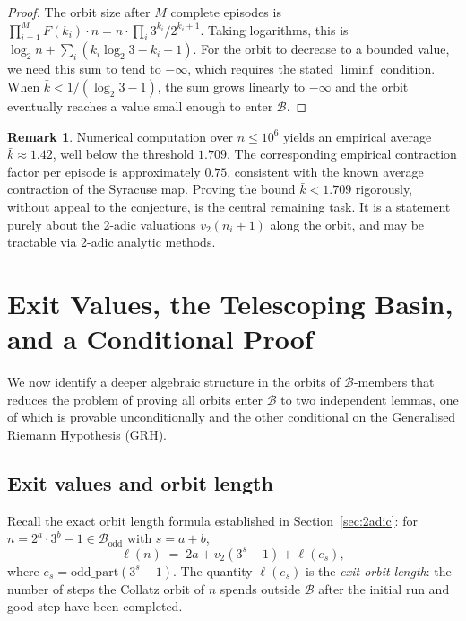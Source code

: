 \documentclass[12pt]{amsart}
\theoremstyle{definition}
\newtheorem{remark}[theorem]{Remark}
\newcommand{\basin}{\mathcal{B}}
\begin{document}
\begin{proof}
  The orbit size after $M$ complete episodes is
  $\prod_{i=1}^M F(k_i) \cdot n = n \cdot \prod_i 3^{k_i}/2^{k_i+1}$.
  Taking logarithms, this is
  $\log_2 n + \sum_i (k_i \log_2 3 - k_i - 1)$.
  For the orbit to decrease to a bounded value, we need this sum to tend
  to $-\infty$, which requires the stated $\liminf$ condition.
  When $\bar{k} < 1/(\log_2 3 - 1)$, the sum grows linearly to $-\infty$
  and the orbit eventually reaches a value small enough to enter $\basin$.
\end{proof}

\begin{remark}
  Numerical computation over $n \leq 10^6$ yields an empirical average
  $\bar{k} \approx 1.42$, well below the threshold $1.709$.  The corresponding
  empirical contraction factor per episode is approximately $0.75$, consistent
  with the known average contraction of the Syracuse map.  Proving the bound
  $\bar{k} < 1.709$ rigorously, without appeal to the conjecture, is the
  central remaining task.  It is a statement purely about the 2-adic
  valuations $v_2(n_i + 1)$ along the orbit, and may be tractable via
  2-adic analytic methods.
\end{remark}

\section{Exit Values, the Telescoping Basin, and a Conditional Proof}
\label{sec:telescoping}

We now identify a deeper algebraic structure in the orbits of $\basin$-members
that reduces the problem of proving all orbits enter $\basin$ to two
independent lemmas, one of which is provable unconditionally and the other
conditional on the Generalised Riemann Hypothesis (GRH).

\subsection{Exit values and orbit length}

Recall the exact orbit length formula established in Section~\ref{sec:2adic}:
for $n = 2^a \cdot 3^b - 1 \in \basin_{\mathrm{odd}}$ with $s = a + b$,
\[
  \ell(n) \;=\; 2a + v_2(3^s - 1) + \ell(e_s),
\]
where $e_s = \mathrm{odd\_part}(3^s - 1)$.
The quantity $\ell(e_s)$ is the \emph{exit orbit length}: the number of steps
the Collatz orbit of $n$ spends outside $\basin$ after the initial run and
good step have been completed.
\end{document}
